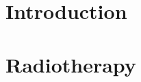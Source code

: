 \documentclass[a4paper]{book}
\begin{document}
	
	
	
	
	
	
	
	\listoffigures
	\listoftables
	\tableofcontents
	\chapterStyleToC
	
	\chapter{Introduction}
	\localtableofcontents
	\begin{chapterabstract}
		
	\end{chapterabstract}
	
	
	\chapter{Radiotherapy}
	\localtableofcontents
	\begin{chapterabstract}
		
	\end{chapterabstract}
	
\end{document}
